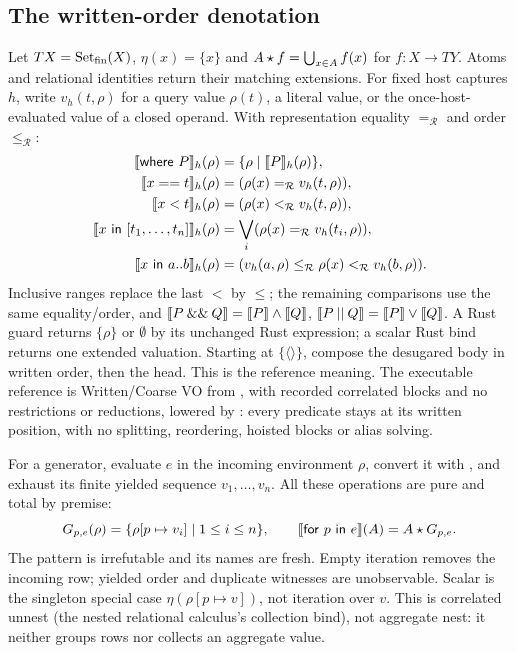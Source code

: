 \subsection{The written-order denotation}
Let $T X=\operatorname{Set}_{\rm fin}(X)$, $\eta(x)=\{x\}$ and
$A\mathbin{\star} f=\bigcup_{x\in A}f(x)$ for $f:X\to TY$.
Atoms and relational identities return their matching extensions.
For fixed host captures $h$, write $v_h(t,\rho)$ for a query value $\rho(t)$,
a literal value, or the once-host-evaluated value of a closed operand.
With representation equality $=_{\mathcal R}$ and order $\leq_{\mathcal R}$:
\[
\begin{aligned}
 \llbracket \mathsf{where}\ P\rrbracket_h(\rho)
   &=\{\rho\mid\llbracket P\rrbracket_h(\rho)\},\\
 \llbracket x==t\rrbracket_h(\rho)&=(\rho(x)=_{\mathcal R}v_h(t,\rho)),\\
 \llbracket x<t\rrbracket_h(\rho)&=(\rho(x)<_{\mathcal R}v_h(t,\rho)),\\
 \llbracket x\ \mathsf{in}\ [t_1,\ldots,t_n]\rrbracket_h(\rho)
   &=\bigvee_i(\rho(x)=_{\mathcal R}v_h(t_i,\rho)),\\
 \llbracket x\ \mathsf{in}\ a..b\rrbracket_h(\rho)
   &=(v_h(a,\rho)\leq_{\mathcal R}\rho(x)<_{\mathcal R}v_h(b,\rho)).
\end{aligned}
\]
Inclusive ranges replace the last $<$ by $\leq$; the remaining comparisons
use the same equality/order, and $\llbracket P\mathbin{\&\&}Q\rrbracket=\llbracket P\rrbracket\land\llbracket Q\rrbracket$,
$\llbracket P\mathbin{||}Q\rrbracket=\llbracket P\rrbracket\lor\llbracket Q\rrbracket$.
A Rust guard returns $\{\rho\}$ or $\emptyset$ by its unchanged Rust
expression; a scalar Rust bind returns one extended valuation.
Starting at $\{\langle\rangle\}$, compose the desugared body in written order, then the
head. This is the reference meaning. The executable reference is Written/Coarse
VO from , with recorded correlated blocks and
no restrictions or reductions, lowered by : every
predicate stays at its written position, with no splitting, reordering,
hoisted blocks or alias solving.

For a generator, evaluate $e$ in the incoming environment $\rho$, convert it
with , and exhaust its finite yielded sequence
$v_1,\ldots,v_n$. All these operations are pure and total by premise:
\[
 G_{p,e}(\rho)=\{\rho[p\mapsto v_i]\mid 1\le i\le n\},\qquad
 \llbracket \mathsf{for}\ p\ \mathsf{in}\ e\rrbracket(A)=A\mathbin{\star} G_{p,e}.
\]
The pattern is irrefutable and its names are fresh. Empty iteration removes
the incoming row; yielded order and duplicate witnesses are unobservable.
Scalar  is the singleton special case
$\eta(\rho[p\mapsto v])$, not iteration over $v$.
This is correlated unnest (the nested relational calculus's collection bind),
not aggregate nest: it neither groups rows nor collects an aggregate value.

